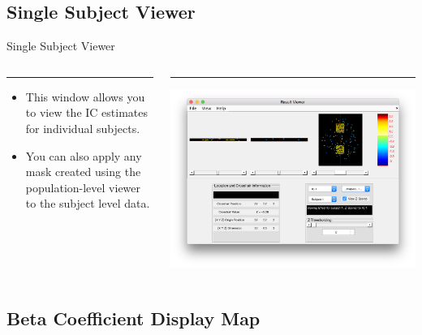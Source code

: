 \documentclass[11pt]{beamer}
\begin{document}
\subsection{Single Subject Viewer}


\begin{frame}{Single Subject Viewer}
\begin{columns}[T] %
	\begin{column}{.4\textwidth}
		\color{black}\rule{\linewidth}{0pt}

\begin{itemize}	
\item This window allows you to view the IC estimates for individual subjects.
\item You can also apply any mask created using the population-level viewer to the subject level data.
\end{itemize}
		
	\end{column}%
	\hfill%
	\begin{column}{.6\textwidth}
		\color{blue}\rule{\linewidth}{0pt}
				\includegraphics[width=1\linewidth]{figs/singleSubjEx}
	\end{column}%
\end{columns}\end{frame}

\subsection{Beta Coefficient Display Map}
\end{document}
